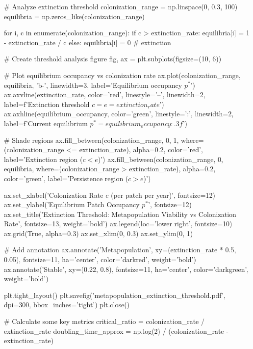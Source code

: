 \documentclass[11pt,a4paper]{article}
\begin{document}
\begin{pycode}
# Analyze extinction threshold
colonization_range = np.linspace(0, 0.3, 100)
equilibria = np.zeros_like(colonization_range)

for i, c in enumerate(colonization_range):
    if c > extinction_rate:
        equilibria[i] = 1 - extinction_rate / c
    else:
        equilibria[i] = 0  # extinction

# Create threshold analysis figure
fig, ax = plt.subplots(figsize=(10, 6))

# Plot equilibrium occupancy vs colonization rate
ax.plot(colonization_range, equilibria, 'b-', linewidth=3, label='Equilibrium occupancy $p^*$')
ax.axvline(extinction_rate, color='red', linestyle='--', linewidth=2,
          label=f'Extinction threshold $c = e = {extinction_rate}$')
ax.axhline(equilibrium_occupancy, color='green', linestyle=':', linewidth=2,
          label=f'Current equilibrium $p^* = {equilibrium_occupancy:.3f}$')

# Shade regions
ax.fill_between(colonization_range, 0, 1,
                where=(colonization_range <= extinction_rate),
                alpha=0.2, color='red', label='Extinction region ($c < e$)')
ax.fill_between(colonization_range, 0, equilibria,
                where=(colonization_range > extinction_rate),
                alpha=0.2, color='green', label='Persistence region ($c > e$)')

ax.set_xlabel('Colonization Rate $c$ (per patch per year)', fontsize=12)
ax.set_ylabel('Equilibrium Patch Occupancy $p^*$', fontsize=12)
ax.set_title('Extinction Threshold: Metapopulation Viability vs Colonization Rate',
            fontsize=13, weight='bold')
ax.legend(loc='lower right', fontsize=10)
ax.grid(True, alpha=0.3)
ax.set_xlim(0, 0.3)
ax.set_ylim(0, 1)

# Add annotation
ax.annotate('Metapopulation\ncollapse',
           xy=(extinction_rate * 0.5, 0.05), fontsize=11,
           ha='center', color='darkred', weight='bold')
ax.annotate('Stable\npersistence',
           xy=(0.22, 0.8), fontsize=11,
           ha='center', color='darkgreen', weight='bold')

plt.tight_layout()
plt.savefig('metapopulation_extinction_threshold.pdf', dpi=300, bbox_inches='tight')
plt.close()

# Calculate some key metrics
critical_ratio = colonization_rate / extinction_rate
doubling_time_approx = np.log(2) / (colonization_rate - extinction_rate)
\end{pycode}
\end{document}
